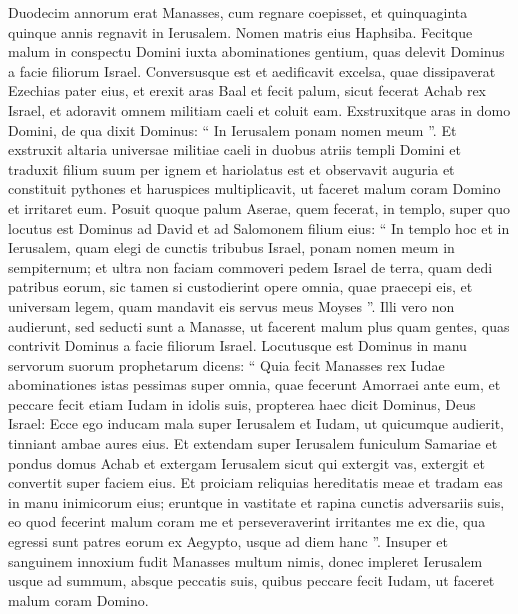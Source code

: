 \begin{biblechapter}
\begin{biblechapter}
\begin{biblechapter}
\begin{biblechapter}
\begin{biblechapter}
\begin{biblechapter}
\begin{biblechapter}
\begin{biblechapter}
\begin{biblechapter}
\begin{biblechapter}
\begin{biblechapter}
\begin{biblechapter}
\begin{biblechapter}
\begin{biblechapter}
\begin{biblechapter}
\begin{biblechapter}
\begin{biblechapter}
\begin{biblechapter}
\begin{biblechapter}
\begin{biblechapter}
\begin{biblechapter}
 \verse Duodecim annorum erat Manasses, cum regnare coepisset, et quinquaginta quinque annis regnavit in Ierusalem. Nomen matris eius Haphsiba. 
\verse Fecitque malum in conspectu Domini iuxta abominationes gentium, quas delevit Dominus a facie filiorum Israel. 
\verse Conversusque est et aedificavit excelsa, quae dissipaverat Ezechias pater eius, et erexit aras Baal et fecit palum, sicut fecerat Achab rex Israel, et adoravit omnem militiam caeli et coluit eam. 
\verse Exstruxitque aras in domo Domini, de qua dixit Dominus: “ In Ierusalem ponam nomen meum ”. 
\verse Et exstruxit altaria universae militiae caeli in duobus atriis templi Domini 
\verse et traduxit filium suum per ignem et hariolatus est et observavit auguria et constituit pythones et haruspices multiplicavit, ut faceret malum coram Domino et irritaret eum. 
\verse Posuit quoque palum Aserae, quem fecerat, in templo, super quo locutus est Dominus ad David et ad Salomonem filium eius: “ In templo hoc et in Ierusalem, quam elegi de cunctis tribubus Israel, ponam nomen meum in sempiternum; 
\verse et ultra non faciam commoveri pedem Israel de terra, quam dedi patribus eorum, sic tamen si custodierint opere omnia, quae praecepi eis, et universam legem, quam mandavit eis servus meus Moyses ”. 
\verse Illi vero non audierunt, sed seducti sunt a Manasse, ut facerent malum plus quam gentes, quas contrivit Dominus a facie filiorum Israel.
 \verse Locutusque est Dominus in manu servorum suorum prophetarum dicens: 
\verse “ Quia fecit Manasses rex Iudae abominationes istas pessimas super omnia, quae fecerunt Amorraei ante eum, et peccare fecit etiam Iudam in idolis suis, 
\verse propterea haec dicit Dominus, Deus Israel: Ecce ego inducam mala super Ierusalem et Iudam, ut quicumque audierit, tinniant ambae aures eius. 
\verse Et extendam super Ierusalem funiculum Samariae et pondus domus Achab et extergam Ierusalem sicut qui extergit vas, extergit et convertit super faciem eius. 
\verse Et proiciam reliquias hereditatis meae et tradam eas in manu inimicorum eius; eruntque in vastitate et rapina cunctis adversariis suis, 
\verse eo quod fecerint malum coram me et perseveraverint irritantes me ex die, qua egressi sunt patres eorum ex Aegypto, usque ad diem hanc ”. 
\verse Insuper et sanguinem innoxium fudit Manasses multum nimis, donec impleret Ierusalem usque ad summum, absque peccatis suis, quibus peccare fecit Iudam, ut faceret malum coram Domino.

\end{biblechapter}
\end{biblechapter}
\end{biblechapter}
\end{biblechapter}
\end{biblechapter}
\end{biblechapter}
\end{biblechapter}
\end{biblechapter}
\end{biblechapter}
\end{biblechapter}
\end{biblechapter}
\end{biblechapter}
\end{biblechapter}
\end{biblechapter}
\end{biblechapter}
\end{biblechapter}
\end{biblechapter}
\end{biblechapter}
\end{biblechapter}
\end{biblechapter}
\end{biblechapter}
